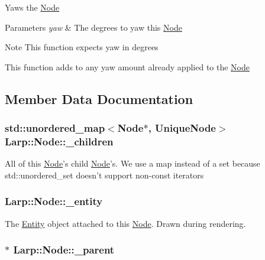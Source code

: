 Yaws the \hyperlink{classLarp_1_1Node}{Node} 
\begin{DoxyParams}{Parameters}
{\em yaw} & The degrees to yaw this \hyperlink{classLarp_1_1Node}{Node} \\
\hline
\end{DoxyParams}
\begin{DoxyNote}{Note}
This function expects yaw in degrees 

This function adds to any yaw amount already applied to the \hyperlink{classLarp_1_1Node}{Node} 
\end{DoxyNote}


\subsection{Member Data Documentation}
\hypertarget{classLarp_1_1Node_a583f7c56966cb7df1759fb42116166f7}{
\subsubsection[{\-\_\-children}]{\setlength{\rightskip}{0pt plus 5cm}std\-::unordered\-\_\-map$<${\bf Node}$\ast$, {\bf Unique\-Node}$>$ Larp\-::\-Node\-::\-\_\-children\hspace{0.3cm}{\ttfamily [private]}}}\label{classLarp_1_1Node_a583f7c56966cb7df1759fb42116166f7}
All of this \hyperlink{classLarp_1_1Node}{Node}'s child \hyperlink{classLarp_1_1Node}{Node}'s. We use a map instead of a set because std\-::unordered\-\_\-set doesn't support non-\/const iterators \hypertarget{classLarp_1_1Node_ab313f78673bfed1596bb1679aec92326}{
\subsubsection[{\-\_\-entity}]{ Larp\-::\-Node\-::\-\_\-entity\hspace{0.3cm}{\ttfamily [private]}}}\label{classLarp_1_1Node_ab313f78673bfed1596bb1679aec92326}
The \hyperlink{classLarp_1_1Entity}{Entity} object attached to this \hyperlink{classLarp_1_1Node}{Node}. Drawn during rendering. \hypertarget{classLarp_1_1Node_affe541c1eca6c4d1863c4d8aca13ea86}{
\subsubsection[{\-\_\-parent}]{$\ast$ Larp\-::\-Node\-::\-\_\-parent\hspace{0.3cm}{\ttfamily [private]}}}\label{classLarp_1_1Node_affe541c1eca6c4d1863c4d8aca13ea86}
